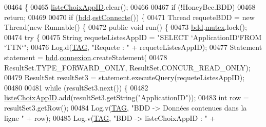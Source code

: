 \begin{DoxyCode}
00464     \{
00465         \hyperlink{classfr_1_1campus_1_1laurainc_1_1honeybee_1_1_ruche_a839228c6a5015c4c3db018316e4e776f}{listeChoixAppID}.clear();
00466 
00467         \textcolor{keywordflow}{if} (!HoneyBee.BDD)
00468             \textcolor{keywordflow}{return};
00469 
00470         \textcolor{keywordflow}{if} (\hyperlink{classfr_1_1campus_1_1laurainc_1_1honeybee_1_1_ruche_a0eb43a2b63fb83e9d5af6cd6b754c7da}{bdd}.\hyperlink{classfr_1_1campus_1_1laurainc_1_1honeybee_1_1_base_de_donnees_a735f54c2c183a595c9a9a5ba947491f5}{estConnecte}()) \{
00471             Thread requeteBDD = \textcolor{keyword}{new} Thread(\textcolor{keyword}{new} Runnable() \{
00472                 \textcolor{keyword}{public} \textcolor{keywordtype}{void} run() \{
00473                     \hyperlink{classfr_1_1campus_1_1laurainc_1_1honeybee_1_1_ruche_a0eb43a2b63fb83e9d5af6cd6b754c7da}{bdd}.\hyperlink{classfr_1_1campus_1_1laurainc_1_1honeybee_1_1_base_de_donnees_a0dd6f285a11459c086adea6080bed282}{mutex}.lock();
00474                     \textcolor{keywordflow}{try} \{
00475                         String requeteListesAppID = \textcolor{stringliteral}{"SELECT `ApplicationID`FROM `TTN`"};
00476                         Log.d(\hyperlink{classfr_1_1campus_1_1laurainc_1_1honeybee_1_1_ruche_a44739cbb0fa7451c1edc240a3f51c257}{TAG}, \textcolor{stringliteral}{"Requete : "} + requeteListesAppID);
00477                         Statement statement = \hyperlink{classfr_1_1campus_1_1laurainc_1_1honeybee_1_1_ruche_a0eb43a2b63fb83e9d5af6cd6b754c7da}{bdd}.\hyperlink{classfr_1_1campus_1_1laurainc_1_1honeybee_1_1_base_de_donnees_a358899633f17b8cd00dd2c4cfdd40abe}{connexion}.createStatement(
00478                                 ResultSet.TYPE\_FORWARD\_ONLY, ResultSet.CONCUR\_READ\_ONLY);
00479                         ResultSet resultSet3 = statement.executeQuery(requeteListesAppID);
00480 
00481                         \textcolor{keywordflow}{while} (resultSet3.next()) \{
00482                             \hyperlink{classfr_1_1campus_1_1laurainc_1_1honeybee_1_1_ruche_a839228c6a5015c4c3db018316e4e776f}{listeChoixAppID}.add(resultSet3.getString(\textcolor{stringliteral}{"ApplicationID"}));
00483                             \textcolor{keywordtype}{int} row = resultSet3.getRow();
00484                             Log.v(\hyperlink{classfr_1_1campus_1_1laurainc_1_1honeybee_1_1_ruche_a44739cbb0fa7451c1edc240a3f51c257}{TAG}, \textcolor{stringliteral}{"BDD -> Données contenues dans la ligne "} + row);
00485                             Log.v(\hyperlink{classfr_1_1campus_1_1laurainc_1_1honeybee_1_1_ruche_a44739cbb0fa7451c1edc240a3f51c257}{TAG}, \textcolor{stringliteral}{"BDD -> listeChoixAppID : "} + 

\end{DoxyCode}
